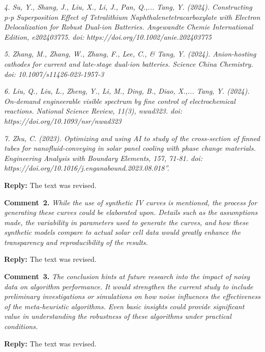 \documentclass[a4paper,fleqn]{cas-sc}
\begin{document}
\emph{
4. Su, Y., Shang, J., Liu, X., Li, J., Pan, Q.,... Tang, Y. (2024). 
Constructing p-p Superposition Effect of Tetralithium Naphthalenetetracarboxylate 
with Electron Delocalization for Robust Dual-ion Batteries. 
Angewandte Chemie International Edition, e202403775. 
doi: https://doi.org/10.1002/anie.202403775 
}

\emph{
5. Zhang, M., Zhang, W., Zhang, F., Lee, C., \& Tang, Y. (2024). 
Anion-hosting cathodes for current and late-stage dual-ion batteries. 
Science China Chemistry. 
doi: 10.1007/s11426-023-1957-3 
}

\emph{
6. Liu, Q., Liu, L., Zheng, Y., Li, M., Ding, B., Diao, X.,... Tang, Y. (2024). 
On-demand engineerable visible spectrum by fine control of electrochemical reactions. 
National Science Review, 11(3), nwad323. 
doi: https://doi.org/10.1093/nsr/nwad323 
}

\emph{
7. Zhu, C. (2023). 
Optimizing and using AI to study of the cross-section of finned 
tubes for nanofluid-conveying in solar panel cooling with phase change materials. 
Engineering Analysis with Boundary Elements, 157, 71-81. 
doi: https://doi.org/10.1016/j.enganabound.2023.08.018''.
}

\noindent
\textcolor[rgb]{0.51,0.00,0.00}{\textbf{Reply:}}
The text was revised.


\vspace{1cm}
\noindent
\textcolor[rgb]{0.00,0.50,1.00}{\textbf{Comment~2.}}
\emph{While the use of synthetic IV curves is mentioned, the process for generating 
these curves could be elaborated upon. 
Details such as the assumptions made, the variability in parameters used to generate the curves, 
and how these synthetic models compare to actual solar cell data would greatly enhance the transparency and reproducibility of the results.}

\noindent
\textcolor[rgb]{0.51,0.00,0.00}{\textbf{Reply:}}
The text was revised.


\vspace{1cm}
\noindent
\textcolor[rgb]{0.00,0.50,1.00}{\textbf{Comment~3.}}
\emph{The conclusion hints at future research into the impact of noisy data on algorithm performance. 
It would strengthen the current study to include preliminary investigations or simulations on how noise influences the effectiveness of the meta-heuristic algorithms. 
Even basic insights could provide significant value in understanding the robustness of these algorithms under practical conditions.}

\noindent
\textcolor[rgb]{0.51,0.00,0.00}{\textbf{Reply:}}
The text was revised.
\end{document}
